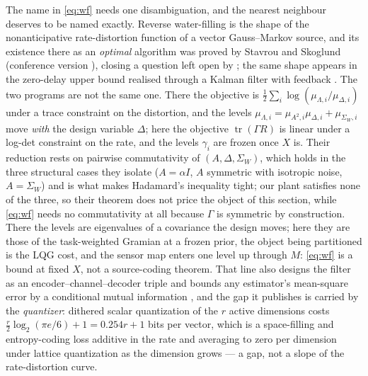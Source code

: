\documentclass[journal]{IEEEtran}
\theoremstyle{remark}
\begin{document}
The name in \eqref{eq:wf} needs one disambiguation, and the nearest neighbour
deserves to be named exactly. Reverse water-filling is the shape of the
nonanticipative rate-distortion function of a vector Gauss--Markov source, and its
existence there as an \emph{optimal} algorithm was proved by Stavrou and Skoglund
\cite{stavrou2022tac} (conference version \cite{stavrou2018asymptotic}), closing a
question left open by \cite{tatikonda2004stochastic}; the same shape appears in the
zero-delay upper bound realised through a Kalman filter with feedback
\cite{stavrou2017itw}. The two programs are not the same one. There the objective
is $\tfrac12\sum_i\log(\mu_{\Lambda,i}/\mu_{\Delta,i})$ under a trace constraint on
the distortion, and the levels $\mu_{\Lambda,i}=\mu_{A^2,i}\mu_{\Delta,i}
+\mu_{\Sigma_W,i}$ move \emph{with} the design variable $\Delta$; here the objective
$\operatorname{tr}(\Gamma R)$ is linear under a log-det constraint on the rate, and
the levels $\gamma_i$ are frozen once $X$ is. Their reduction rests on pairwise
commutativity of $(A,\Delta,\Sigma_W)$, which holds in the three structural cases
they isolate ($A=\alpha I$, $A$ symmetric with isotropic noise, $A=\Sigma_W$) and is
what makes Hadamard's inequality tight; our plant satisfies none of the three, so
their theorem does not price the object of this section, while \eqref{eq:wf} needs
no commutativity at all because $\Gamma$ is symmetric by construction. There the
levels are eigenvalues of a covariance the design moves; here they are those of the
task-weighted Gramian at a frozen prior, the object being partitioned is the LQG
cost, and the sensor map enters one level up through $M$: \eqref{eq:wf} is a bound
at fixed $X$, not a source-coding theorem.
That line also designs the filter as an encoder--channel--decoder triple and bounds
any estimator's mean-square error by a conditional mutual information
\cite{stavrou2016estimation}, and the gap it publishes is carried by the
\emph{quantizer}: dithered scalar quantization of the $r$ active dimensions costs
$\tfrac r2\log_2(\pi e/6)+1=0.254r+1$ bits per vector, which is a space-filling and
entropy-coding loss additive in the rate and averaging to zero per dimension under
lattice quantization as the dimension grows \cite{stavrou2018zerodelay} --- a gap,
not a slope of the rate-distortion curve.
\end{document}
